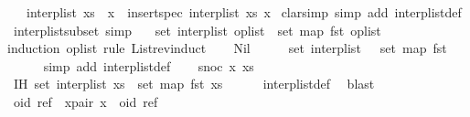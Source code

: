\begin{isabellebody}
\ \ \ {\isachardoublequoteopen}interp{\isacharunderscore}list\ {\isacharparenleft}xs\ {\isacharat}\ {\isacharbrackleft}x{\isacharbrackright}{\isacharparenright}\ {\isacharequal}\ insert{\isacharunderscore}spec\ {\isacharparenleft}interp{\isacharunderscore}list\ xs{\isacharparenright}\ x{\isachardoublequoteclose}\isanewline
%
\isadelimproof
%
\endisadelimproof
%
\isatagproof
{}\isamarkupfalse%
\ {\isacharparenleft}clarsimp\ simp\ add{\isacharcolon}\ interp{\isacharunderscore}list{\isacharunderscore}def{\isacharparenright}%
\endisatagproof
{\isafoldproof}%
%
\isadelimproof
\isanewline
%
\endisadelimproof
\isanewline
{}\isamarkupfalse%
\ interp{\isacharunderscore}list{\isacharunderscore}subset\ {\isacharbrackleft}simp{\isacharbrackright}{\isacharcolon}\isanewline
\ \ \ {\isachardoublequoteopen}set\ {\isacharparenleft}interp{\isacharunderscore}list\ op{\isacharunderscore}list{\isacharparenright}\ {\isasymsubseteq}\ set\ {\isacharparenleft}map\ fst\ op{\isacharunderscore}list{\isacharparenright}{\isachardoublequoteclose}\isanewline
%
\isadelimproof
%
\endisadelimproof
%
\isatagproof
{}\isamarkupfalse%
{\isacharparenleft}induction\ op{\isacharunderscore}list\ rule{\isacharcolon}\ List{\isachardot}rev{\isacharunderscore}induct{\isacharparenright}\isanewline
\ \ \isamarkupfalse%
\ Nil\isanewline
\ \ \isamarkupfalse%
\ \isamarkupfalse%
\ {\isachardoublequoteopen}set\ {\isacharparenleft}interp{\isacharunderscore}list\ {\isacharbrackleft}{\isacharbrackright}{\isacharparenright}\ {\isasymsubseteq}\ set\ {\isacharparenleft}map\ fst\ {\isacharbrackleft}{\isacharbrackright}{\isacharparenright}{\isachardoublequoteclose}\isanewline
\ \ \ \ \isamarkupfalse%
\ {\isacharparenleft}simp\ add{\isacharcolon}\ interp{\isacharunderscore}list{\isacharunderscore}def{\isacharparenright}\isanewline
{}\isamarkupfalse%
\isanewline
\ \ \isamarkupfalse%
\ {\isacharparenleft}snoc\ x\ xs{\isacharparenright}\isanewline
\ \ \isamarkupfalse%
\ IH{\isacharcolon}\ {\isachardoublequoteopen}set\ {\isacharparenleft}interp{\isacharunderscore}list\ xs{\isacharparenright}\ {\isasymsubseteq}\ set\ {\isacharparenleft}map\ fst\ xs{\isacharparenright}{\isachardoublequoteclose}\isanewline
\ \ \ \ \isamarkupfalse%
\ interp{\isacharunderscore}list{\isacharunderscore}def\ \isamarkupfalse%
\ blast\isanewline
\ \ \isamarkupfalse%
\ oid\ ref\ \ x{\isacharunderscore}pair{\isacharcolon}\ {\isachardoublequoteopen}x\ {\isacharequal}\ {\isacharparenleft}oid{\isacharcomma}\ ref{\isacharparenright}{\isachardoublequoteclose}\isanewline

\end{isabellebody}
